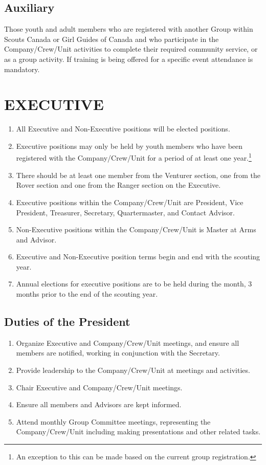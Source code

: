 \documentclass{Service_Corps_Document}
\begin{document}
    \subsection{Auxiliary}\label{subsec:auxiliary}
    Those youth and adult members who are registered with another Group within Scouts Canada or Girl Guides of Canada and who participate in the Company/Crew/Unit activities to complete their required community service, or as a group activity.
    If training is being offered for a specific event attendance is mandatory.


    \section{EXECUTIVE}\label{sec:executive}
    \begin{enumerate}
        \item All Executive and Non-Executive positions will be elected positions.
        \item Executive positions may only be held by youth members who have been registered with the Company/Crew/Unit for a period of at least one year.\footnote{An exception to this can be made based on the current group registration.}
        \item There should be at least one member from the Venturer section, one from the Rover section and one from the Ranger section on the Executive.\footnotemark[\value{footnote}]
        \item Executive positions within the Company/Crew/Unit are President, Vice President, Treasurer, Secretary, Quartermaster, and Contact Advisor.
        \item Non-Executive positions within the Company/Crew/Unit is Master at Arms and Advisor.
        \item Executive and Non-Executive position terms begin and end with the scouting year.
        \item Annual elections for executive positions are to be held during the month, 3 months prior to the end of the scouting year.
    \end{enumerate}

    \subsection{Duties of the President}\label{subsec:duties-of-the-president}
    \begin{enumerate}
        \item Organize Executive and Company/Crew/Unit meetings, and ensure all members are notified, working in conjunction with the Secretary.
        \item Provide leadership to the Company/Crew/Unit at meetings and activities.
        \item Chair Executive and Company/Crew/Unit meetings.
        \item Ensure all members and Advisors are kept informed.
        \item Attend monthly Group Committee meetings, representing the Company/Crew/Unit including making presentations and other related tasks.
    \end{enumerate}
\end{document}
